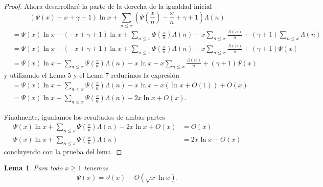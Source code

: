 \documentclass{article}
\newtheorem{lemma}[theorem]{Lema}
\theoremstyle{definition}
\theoremstyle{remark}
\begin{document}
\begin{proof}
Ahora desarrollar\'e la parte de la derecha de la igualdad inicial
$$(\Psi(x) - x + \gamma + 1) \ln x + \sum_{n \leq x} \left(\Psi\left(\frac{x}{n}\right) - \frac{x}{n} + \gamma + 1\right) \Lambda(n)$$
\begin{align*}
&= \Psi(x)\ln x + (-x + \gamma + 1) \ln x + \sum_{n \leq x} \Psi\left(\frac{x}{n}\right)\Lambda(n) - x \sum_{n \leq x} \frac{\Lambda(n)}{n} + (\gamma + 1) \sum_{n \leq x} \Lambda(n) \\
&= \Psi(x)\ln x + (-x + \gamma + 1) \ln x + \sum_{n \leq x} \Psi\left(\frac{x}{n}\right)\Lambda(n) - x \sum_{n \leq x} \frac{\Lambda(n)}{n} + (\gamma + 1) \Psi(x) \\
&= \Psi(x)\ln x + \sum_{n \leq x} \Psi\left(\frac{x}{n}\right)\Lambda(n) - x \ln x - x \sum_{n \leq x} \frac{\Lambda(n)}{n} + (\gamma + 1)\Psi(x)
\end{align*}
y utilizando el Lema 5 y el Lema 7 reducimos la expresi\'on
\begin{align*}
&= \Psi(x)\ln x + \sum_{n \leq x} \Psi\left(\frac{x}{n}\right)\Lambda(n) - x \ln x - x(\ln x + O(1)) + O(x) \\
&= \Psi(x)\ln x + \sum_{n \leq x} \Psi\left(\frac{x}{n}\right)\Lambda(n) - 2x \ln x + O(x).
\end{align*}

Finalmente, igualamos los resultados de ambas partes
\begin{align*}
\Psi(x)\ln x + \sum_{n \leq x} \Psi\left(\frac{x}{n}\right)\Lambda(n) - 2x \ln x + O(x) &= O(x)\\
\Psi(x)\ln x + \sum_{n \leq x} \Psi\left(\frac{x}{n}\right)\Lambda(n) &= 2x \ln x + O(x)
\end{align*}
concluyendo con la prueba del lema.
\end{proof}

\begin{lemma}
Para todo $x \geq 1$ tenemos
$$\Psi(x) = \vartheta(x) + O(\sqrt{x}\ln x).$$
\end{lemma}
\end{document}

